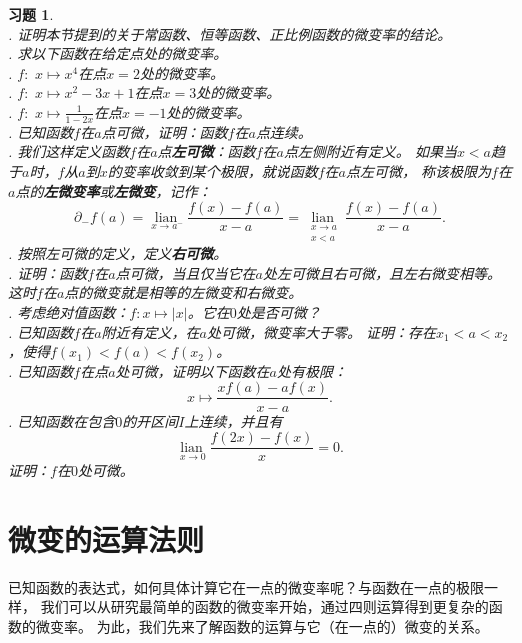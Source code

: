 \documentclass[12pt,UTF8]{ctexbook}
\newcommand{\lian}[1]{
    \underset{#1}{\operatorname{lian}\,}
}
\theoremstyle{definition}
\theoremstyle{plain}
\newtheorem{xt}{习题}[section]
\begin{document}
\begin{xt}
    \mbox{} \\
    . 证明本节提到的关于常函数、恒等函数、正比例函数的微变率的结论。\\
    . 求以下函数在给定点处的微变率。\\
    . $f: \,\, x \mapsto x^4$在点$x = 2$处的微变率。\\
    . $f: \,\, x \mapsto x^2 - 3x + 1$在点$x = 3$处的微变率。\\
    . $f: \,\, x \mapsto \frac{1}{1 - 2x}$在点$x = -1$处的微变率。\\
    . 已知函数$f$在$a$点可微，证明：函数$f$在$a$点连续。\\
    . 我们这样定义函数$f$在$a$点\textbf{左可微}：函数$f$在$a$点左侧附近有定义。
    如果当$x<a$趋于$a$时，$f$从$a$到$x$的变率收敛到某个极限，就说函数$f$在$a$点左可微，
    称该极限为$f$在$a$点的\textbf{左微变率}或\textbf{左微变}，记作：
    $$ \partial_- f(a) = \lian{x\to a^-} \frac{f(x) - f(a)}{x - a} = \lian{\substack{x\to a \\ x < a}} \frac{f(x) - f(a)}{x - a}. $$
    . 按照左可微的定义，定义\textbf{右可微}。\\
    . 证明：函数$f$在$a$点可微，当且仅当它在$a$处左可微且右可微，且左右微变相等。
    这时$f$在$a$点的微变就是相等的左微变和右微变。\\
    . 考虑绝对值函数：$f:x\mapsto |x|$。它在$0$处是否可微？\\
    . 已知函数$f$在$a$附近有定义，在$a$处可微，微变率大于零。
    证明：存在$x_1 < a < x_2$，使得$f(x_1) < f(a) < f(x_2)$。\\
    . 已知函数$f$在点$a$处可微，证明以下函数在$a$处有极限：
    $$ x \mapsto \frac{xf(a) - af(x)}{x - a}.$$
    . 已知函数在包含$0$的开区间$I$上连续，并且有
    $$ \lian{x\to 0} \frac{f(2x) - f(x)}{x} = 0.$$
    \indent 证明：$f$在$0$处可微。
\end{xt}

\section{微变的运算法则}
已知函数的表达式，如何具体计算它在一点的微变率呢？与函数在一点的极限一样，
我们可以从研究最简单的函数的微变率开始，通过四则运算得到更复杂的函数的微变率。
为此，我们先来了解函数的运算与它（在一点的）微变的关系。
\end{document}
